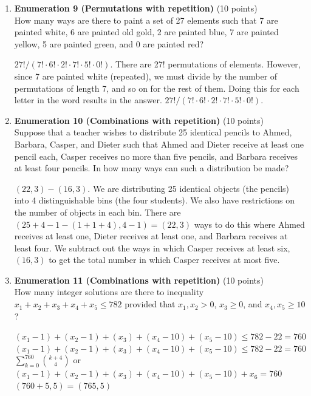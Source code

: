 \begin{enumerate}
  \newpage




  \item \textbf{Enumeration 9 (Permutations with repetition)} (10 points)\\
  How many ways are there to paint a set of 27 elements such that 7 are painted white, 6 are painted old gold, 2 are painted blue, 7 are painted yellow, 5 are painted green, and 0 are painted red?
  \begin{subanswer}
    $27!/(7! \cdot 6! \cdot 2! \cdot 7! \cdot 5! \cdot 0!)$. There are 27! permutations of elements. However, since 7 are painted white (repeated), we must divide by the number of permutations of length 7, and so on for the rest of them. Doing this for each letter in the word results in the answer.
    $27!/(7! \cdot 6! \cdot 2! \cdot 7! \cdot 5! \cdot 0!)$.
  \end{subanswer}


  \item \textbf{Enumeration 10 (Combinations with repetition)} (10 points)\\
  Suppose that a teacher wishes to distribute 25 identical pencils to Ahmed, Barbara, Casper, and Dieter such that Ahmed and Dieter receive at least one pencil each, Casper receives no more than five pencils, and Barbara receives at least four pencils. In how many ways can such a distribution be made?
  \begin{subanswer}
    $(22,3)-(16,3)$. We are distributing 25 identical objects (the pencils) into 4 distinguishable bins (the four students). We also have restrictions on the number of objects in each bin. There are $(25+4-1-(1+1+4),4-1)=(22,3)$ ways to do this where Ahmed receives at least one, Dieter receives at least one, and Barbara receives at least four. We subtract out the ways in which Casper receives at least six, $(16,3)$ to get the total number in which Casper receives at most five.
  \end{subanswer}

  

  \item \textbf{Enumeration 11 (Combinations with repetition)} (10 points)\\
  How many integer solutions are there to inequality
  $x_1+x_2+x_3+x_4+x_5 \leq 782$
  provided that $x_1,x_2>0$, $x_3 \geq 0$, and $x_4,x_5 \geq 10$ ?
  \begin{subanswer}
    $(x_1-1)+(x_2-1)+(x_3 )+(x_4-10)+(x_5-10) \leq 782-22=760$
    $(x_1-1)+(x_2-1)+(x_3 )+(x_4-10)+(x_5-10) \leq 782-22=760$
    $\sum_{k=0}^{760} \binom{k+4}{4}$
    or
    $(x_1-1)+(x_2-1)+(x_3 )+(x_4-10)+(x_5-10)+x_6=760$
    $(760+5,5)=(765,5)$
  \end{subanswer}









\end{enumerate}
